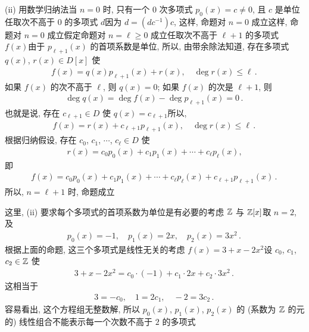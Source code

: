 \begin{pf}
    (ii) 用数学归纳法\period 当 $n=0$ 时, 只有一个 $0$ 次多项式 $p_0 (x) = c \neq 0$, 且 $c$ 是单位\period 任取次不高于 $0$ 的多项式 $d$\period 因为 $d = (dc^{-1})c$, 这样, 命题对 $n=0$ 成立\period 这样, 命题对 $n=0$ 成立\period 假定命题对 $n = \ell \geq 0$ 成立\period 任取次不高于 $\ell + 1$ 的多项式 $f(x)$\period 由于 $p_{\ell + 1} (x)$ 的首项系数是单位, 所以, 由带余除法知道, 存在多项式 $q(x)$, $r(x) \in D[x]$ 使
    \begin{align*}
        f(x) = q(x) p_{\ell + 1} (x) + r(x), \quad \deg r(x) \leq \ell \period
    \end{align*}
    如果 $f(x)$ 的次不高于 $\ell$, 则 $q(x) = 0$; 如果 $f(x)$ 的次是 $\ell + 1$, 则
    \begin{align*}
        \deg q(x) = \deg f(x) - \deg p_{\ell+1} (x) = 0 \period
    \end{align*}
    也就是说, 存在 $c_{\ell + 1} \in D$ 使 $q(x) = c_{\ell + 1}$\period 所以,
    \begin{align*}
        f(x) = r(x) + c_{\ell + 1} p_{\ell + 1} (x), \quad \deg r(x) \leq \ell \period
    \end{align*}
    根据归纳假设, 存在 $c_0$, $c_1$, $\cdots$, $c_{\ell} \in D$ 使
    \begin{align*}
        r(x) = c_0 p_0 (x) + c_1 p_1 (x) + \cdots + c_{\ell} p_{\ell} (x),
    \end{align*}
    即
    \begin{align*}
        f(x) = c_0 p_0 (x) + c_1 p_1 (x) + \cdots + c_{\ell} p_{\ell} (x) + c_{\ell + 1} p_{\ell + 1} (x) \period
    \end{align*}
    所以, $n = \ell + 1$ 时, 命题成立\period
\end{pf}

\begin{example}
    这里, (ii) 要求每个多项式的首项系数为单位是有必要的\period 考虑 $\mathbb{Z}$ 与 $\mathbb{Z}[x]$\period 取 $n=2$, 及
    \begin{align*}
        p_0 (x) = -1, \quad p_1 (x) = 2x, \quad p_2 (x) = 3x^2 \period
    \end{align*}
    根据上面的命题, 这三个多项式是线性无关的\period 考虑 $f(x) = 3 + x - 2x^2$\period 设 $c_0$, $c_1$, $c_2 \in \mathbb{Z}$ 使
    \begin{align*}
        3 + x - 2x^2 = c_0 \cdot (-1) + c_1 \cdot 2x + c_2 \cdot 3x^2 \period
    \end{align*}
    这相当于
    \begin{align*}
        3 = -c_0, \quad 1 = 2c_1, \quad -2 = 3c_2 \period
    \end{align*}
    容易看出, 这个方程组无整数解, 所以 $p_0 (x)$, $p_1 (x)$, $p_2 (x)$ 的 (系数为 $\mathbb{Z}$ 的元的) 线性组合不能表示每一个次数不高于 $2$ 的多项式\period
\end{example}

